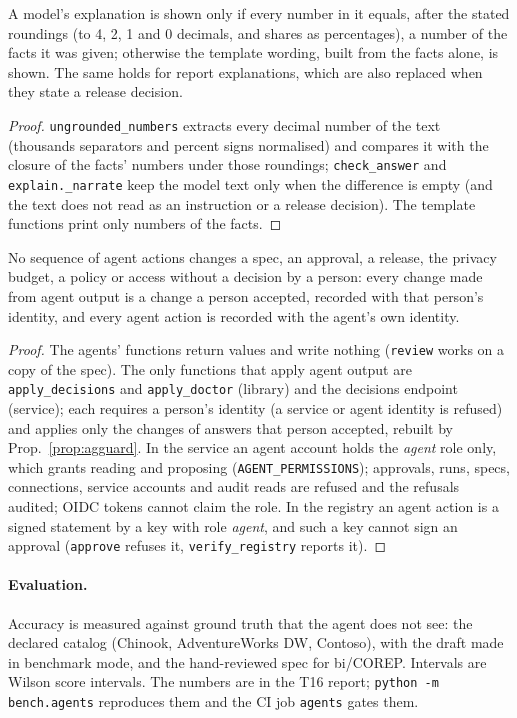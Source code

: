 \begin{proposition}\label{prop:aggrounded}
A model's explanation is shown only if every number in it equals, after the stated roundings (to 4, 2, 1 and 0
decimals, and shares as percentages), a number of the facts it was given; otherwise the template wording, built from
the facts alone, is shown. The same holds for report explanations, which are also replaced when they state a release
decision.
\end{proposition}
\begin{proof}
\texttt{ungrounded\_numbers} extracts every decimal number of the text (thousands separators and percent signs
normalised) and compares it with the closure of the facts' numbers under those roundings; \texttt{check\_answer} and
\texttt{explain.\_narrate} keep the model text only when the difference is empty (and the text does not read as an
instruction or a release decision). The template functions print only numbers of the facts.
\end{proof}

\begin{proposition}[No authority]\label{prop:agauthority}
No sequence of agent actions changes a spec, an approval, a release, the privacy budget, a policy or access without
a decision by a person: every change made from agent output is a change a person accepted, recorded with that
person's identity, and every agent action is recorded with the agent's own identity.
\end{proposition}
\begin{proof}
The agents' functions return values and write nothing (\texttt{review} works on a copy of the spec). The only
functions that apply agent output are \texttt{apply\_decisions} and \texttt{apply\_doctor} (library) and the
decisions endpoint (service); each requires a person's identity (a service or agent identity is refused) and applies
only the changes of answers that person accepted, rebuilt by Prop.~\ref{prop:agguard}. In the service an agent
account holds the \emph{agent} role only, which grants reading and proposing (\texttt{AGENT\_PERMISSIONS}); approvals,
runs, specs, connections, service accounts and audit reads are refused and the refusals audited; OIDC tokens cannot
claim the role. In the registry an agent action is a signed statement by a key with role \emph{agent}, and such a key
cannot sign an approval (\texttt{approve} refuses it, \texttt{verify\_registry} reports it).
\end{proof}

\paragraph{Evaluation.} Accuracy is measured against ground truth that the agent does not see: the declared catalog
(Chinook, AdventureWorks DW, Contoso), with the draft made in benchmark mode, and the hand-reviewed spec for
bi/COREP. Intervals are Wilson score intervals. The numbers are in the T16 report; \texttt{python -m bench.agents}
reproduces them and the CI job \texttt{agents} gates them.
\setcounter{proposition}{\value{savedpropag}}
